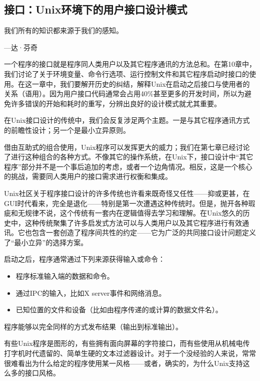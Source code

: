 \documentclass[12pt,oneside]{ctexbook}
\begin{document}
\begin{common-format}
\chapter{接口：Unix环境下的用户接口设计模式}
\begin{flushright}
\begin{notecard}{20em}
我们所有的知识都来源于我们的感知。

{\hfill —达·芬奇}
\end{notecard}
\end{flushright}

一个程序的接口就是程序同人类用户以及其它程序通讯的方法总和。在第10章中，我们讨论了关于环境变量、命令行选项、运行控制文件和其它程序启动时接口的使用。在这一章中，我们要解开历史的纠结，解释Unix在启动之后接口与使用者的关系（语用）。因为用户接口代码通常会占用40\%{}甚至更多的开发时间，所以为避免许多错误的开始和耗时的重写，分辨出良好的设计模式就尤其重要。

在Unix接口设计的传统中，我们会反复涉足两个主题。一是与其它程序通讯方式的前瞻性设计；另一个是最小立异原则。

借由互助式的组合使用，Unix程序可以发挥更大的威力；我们在第七章已经讨论了进行这种组合的各种方式。不像其它的操作系统，在Unix下，接口设计中“其它程序”部分并不是一个事后追加的考虑，或者一个边角情况。相反，这是一个核心的挑战，需要同人类用户的接口需求进行权衡和集成。

Unix社区关于程序接口设计的许多传统也许看来既奇怪又任性——抑或更甚，在GUI时代看来，完全是退化——特别是第一次遭遇这种传统时。但是，抛开各种瑕疵和无规律不说，这个传统有一套内在逻辑值得去学习和理解。在Unix悠久的历史中，这种传统聚集了许多启发式方法可以与人类用户以及其它程序进行有效通讯。它也包含一套创造了程序间共性的约定——它为广泛的共同接口设计问题定义了“最小立异”的选择方案。

启动之后，程序通常通过下列来源获得输入或命令：
\begin{itemize}
\item 程序标准输入端的数据和命令。
\item 通过IPC的输入，比如X server事件和网络消息。
\item 已知位置的文件和设备（比如由程序传递的或计算的数据文件名）。
\end{itemize}

程序能够以完全同样的方式发布结果（输出到标准输出）。

有些Unix程序是图形的，有些拥有面向屏幕的字符接口，而有些使用从机械电传打字机时代遗留的、简单生硬的文本过滤器设计。对于一个没经验的人来说，常常很难看出为什么给定的程序使用某一风格——或者，确实的，为什么Unix支持这么多的接口风格。


\end{common-format}
\end{document}
